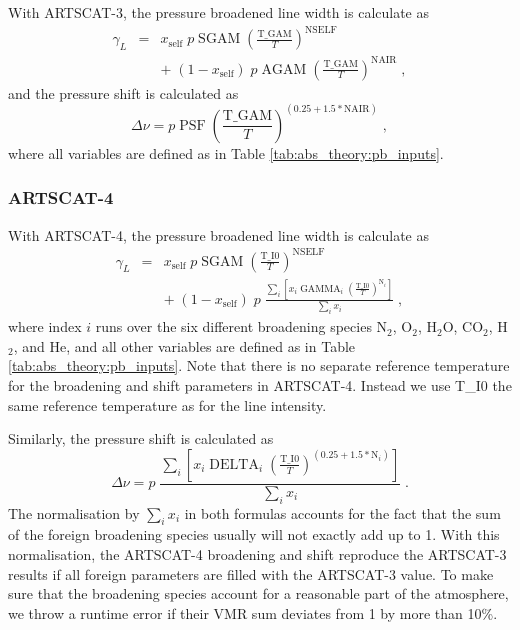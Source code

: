 With ARTSCAT-3, the pressure broadened line width is calculate as
\begin{eqnarray}
  \gamma_L &=& x_\mathrm{self} \; p \; \mathrm{SGAM} \; 
             \left(
             \frac{\mathrm{T\_GAM}}{T}
             \right)^{\mathrm{NSELF}} \nonumber \\
           & &
             + \; (1-x_\mathrm{self}) \; p \; \mathrm{AGAM} \; 
             \left(
             \frac{\mathrm{T\_GAM}}{T}
             \right)^{\mathrm{NAIR}} \;,
\end{eqnarray}
and the pressure shift is calculated as
\begin{equation}
  \Delta \nu = p \; \mathrm{PSF} \; 
             \left(
             \frac{\mathrm{T\_GAM}}{T}
             \right)^{(0.25 + 1.5 * \mathrm{NAIR})} \;,
\end{equation}
where all variables are defined as in Table \ref{tab:abs_theory:pb_inputs}. 



\subsubsection{ARTSCAT-4}

With ARTSCAT-4, the pressure broadened line width is calculate as
\begin{eqnarray}
  \gamma_L &=& x_\mathrm{self} \; p \; \mathrm{SGAM} \; 
               \left(
               \frac{\mathrm{T\_I0}}{T}
               \right)^{\mathrm{NSELF}}
               \nonumber \\
           & & + \; (1-x_\mathrm{self}) \; p \; 
               \frac{\sum_i \left[ x_i \; \mathrm{GAMMA}_i \;
                     \left(
                     \frac{\mathrm{T\_I0}}{T}
                     \right)^{\mathrm{N}_i} \right] }
               {\sum_i x_i} \;,
\end{eqnarray}
where index $i$ runs over the six different broadening species N$_2$,
O$_2$, H$_2$O, CO$_2$, H$_2$, and He, and all other variables are
defined as in Table \ref{tab:abs_theory:pb_inputs}. Note that there is
no separate reference temperature for the broadening and shift
parameters in ARTSCAT-4. Instead we use T\_I0 the same reference
temperature as for the line intensity.
 
Similarly, the pressure shift is calculated as
\begin{equation}
\Delta \nu = p \; 
             \frac{\sum_i \left[ x_i \; \mathrm{DELTA}_i \;
                   \left(
                   \frac{\mathrm{T\_I0}}{T}
                   \right)^{(0.25 + 1.5 * \mathrm{N}_i)} \right] }
             {\sum_i x_i} \;.
\end{equation}
The normalisation by $\sum_i x_i$ in both formulas accounts for the fact that the sum
of the foreign broadening species usually will not exactly add up to
1. With this normalisation, the ARTSCAT-4 broadening and shift
reproduce the
ARTSCAT-3  results if all foreign parameters are filled with the
ARTSCAT-3 value. To make sure that the broadening species account for
a reasonable part of the atmosphere, we throw a runtime error if their
VMR sum deviates from 1 by more than 10\%.

